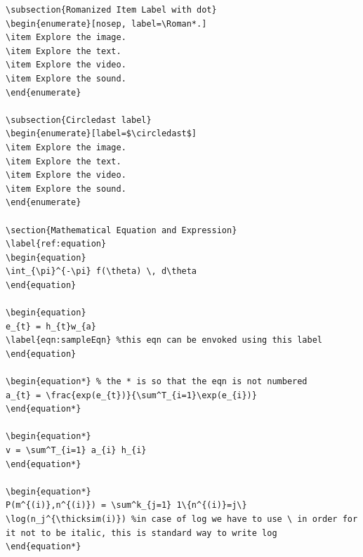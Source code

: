 \documentclass{article}
\begin{document}
\begin{lstlisting}
\subsection{Romanized Item Label with dot}
\begin{enumerate}[nosep, label=\Roman*.]
\item Explore the image.
\item Explore the text.
\item Explore the video.
\item Explore the sound.
\end{enumerate}

\subsection{Circledast label}
\begin{enumerate}[label=$\circledast$]
\item Explore the image.
\item Explore the text.
\item Explore the video.
\item Explore the sound.
\end{enumerate}

\section{Mathematical Equation and Expression}
\label{ref:equation}
\begin{equation}
\int_{\pi}^{-\pi} f(\theta) \, d\theta
\end{equation}

\begin{equation}
e_{t} = h_{t}w_{a}
\label{eqn:sampleEqn} %this eqn can be envoked using this label
\end{equation}

\begin{equation*} % the * is so that the eqn is not numbered
a_{t} = \frac{exp(e_{t})}{\sum^T_{i=1}\exp(e_{i})}
\end{equation*}

\begin{equation*}
v = \sum^T_{i=1} a_{i} h_{i}
\end{equation*}

\begin{equation*}
P(m^{(i)},n^{(i)}) = \sum^k_{j=1} 1\{n^{(i)}=j\} \log(n_j^{\thicksim(i)}) %in case of log we have to use \ in order for it not to be italic, this is standard way to write log
\end{equation*}


\end{lstlisting}
\end{document}
